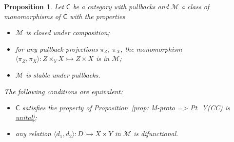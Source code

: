 \documentclass[11pt]{amsart}
\theoremstyle{plain}
\newtheorem{proposition}[subsection]{Proposition}
\theoremstyle{definition}
\theoremstyle{remark}
\newcommand{\C}{\ensuremath{\mathsf{C}}}
\newcommand{\M}{\ensuremath{\mathscr{M}}}
\newcommand{\la}{\langle}
\newcommand{\ra}{\rangle}
\newcommand{\mono}{\rightarrowtail}
\begin{document}
\begin{proposition}\label{prop: Pt_Y(CC) unital <=> M-Mal'tsev} Let $\C$ be a category with pullbacks and $\M$ a class of monomorphisms of $\C$ with the properties
\begin{itemize}
	\item[(P2)] $\M$ is closed under composition;
	\item[(P4)] for any pullback projections $\pi_Z$, $\pi_X$, the monomorphism $\la \pi_Z,\pi_X\ra\colon Z\times_Y X\mono Z\times X$ is in $\M$;
	\item[(P5)] $\M$ is stable under pullbacks.
\end{itemize}
The following conditions are equivalent:
\begin{itemize}
	\item[(i)] $\C$ satisfies the property of Proposition~\ref{prop: M-proto => Pt_Y(CC) is unital};
	\item[(ii)] any relation $\la d_1,d_2\ra\colon  D \mono X\times Y$ in $\M$ is difunctional.
\end{itemize}
\end{proposition}
\end{document}
